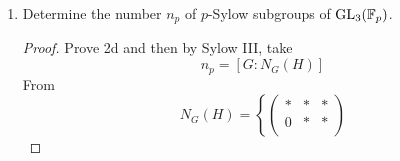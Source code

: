 \documentclass[../psets.tex]{subfiles}
\begin{document}
\begin{enumerate}
\begin{enumerate}
\begin{proof}
            then
            \begin{equation*}
                \underbrace{
                    \begin{pmatrix}
                        1 & 0 & 0\\
                        0 & 0 & 1\\
                        0 & 1 & 0\\
                    \end{pmatrix}
                }_g\underbrace{
                    \begin{pmatrix}
                        1 & 0 & 0\\
                        0 & 1 & 2\\
                        0 & 0 & 1\\
                    \end{pmatrix}
                }_h\underbrace{
                    \begin{pmatrix}
                        1 & 0 & 0\\
                        0 & 0 & 1\\
                        0 & 1 & 0\\
                    \end{pmatrix}
                }_{g^{-1}}
                =
                \begin{pmatrix}
                    1 & 0 & 0\\
                    0 & 1 & 0\\
                    0 & 2 & 1\\
                \end{pmatrix}
                \notin H
            \end{equation*}
            as desired.
        \end{proof}
        \item Determine the number $n_p$ of $p$-Sylow subgroups of $\text{GL}_3(\mathbb{F}_p)$.
        \begin{proof}
            Prove 2d and then by Sylow III, take
            \begin{equation*}
                n_p = [G:N_G(H)]
            \end{equation*}
            From
            \begin{equation*}
                N_G(H) = \left\{
                    \begin{pmatrix}
                        * & * & *\\
                        0 & * & *\\

\end{pmatrix}
\end{equation*}
\end{proof}
\end{enumerate}
\end{enumerate}
\end{document}
